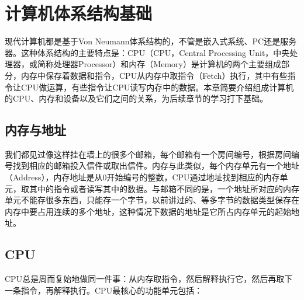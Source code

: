 

\chapter{计算机体系结构基础}
%
现代计算机都是基于Von Neumann体系结构的，不管是嵌入式系统、PC还是服务器。这种体系结构的主要特点是：CPU（CPU，Central Processing Unit，中央处理器，或简称处理器Processor）和内存（Memory）是计算机的两个主要组成部分，内存中保存着数据和指令，CPU从内存中取指令（Fetch）执行，其中有些指令让CPU做运算，有些指令让CPU读写内存中的数据。本章简要介绍组成计算机的CPU、内存和设备以及它们之间的关系，为后续章节的学习打下基础。




\section{内存与地址}
%


我们都见过像这样挂在墙上的很多个邮箱，每个邮箱有一个房间编号，根据房间编号找到相应的邮箱投入信件或取出信件。内存与此类似，每个内存单元有一个地址（Address），内存地址是从0开始编号的整数，CPU通过地址找到相应的内存单元，取其中的指令或者读写其中的数据。与邮箱不同的是，一个地址所对应的内存单元不能存很多东西，只能存一个字节，以前讲过的、等多字节的数据类型保存在内存中要占用连续的多个地址，这种情况下数据的地址是它所占内存单元的起始地址。




\section{CPU}
%
CPU总是周而复始地做同一件事：从内存取指令，然后解释执行它，然后再取下一条指令，再解释执行。CPU最核心的功能单元包括：


